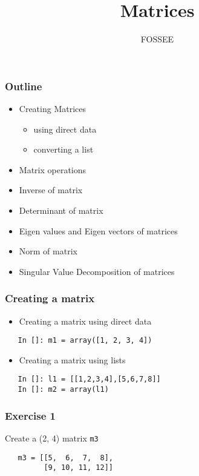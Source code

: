 \documentclass[presentation]{beamer}
\title{Matrices}
\author{FOSSEE}
\date{}
\begin{document}
\maketitle









\begin{frame}
\frametitle{Outline}
\label{sec-1}

\begin{itemize}
\item Creating Matrices

\begin{itemize}
\item using direct data
\item converting a list
\end{itemize}

\item Matrix operations
\item Inverse of matrix
\item Determinant of matrix
\item Eigen values and Eigen vectors of matrices
\item Norm of matrix
\item Singular Value Decomposition of matrices
\end{itemize}
\end{frame}
\begin{frame}[fragile]
\frametitle{Creating a matrix}
\label{sec-2}

\begin{itemize}
\item Creating a matrix using direct data
\end{itemize}

\begin{verbatim}
   In []: m1 = array([1, 2, 3, 4])
\end{verbatim}

\begin{itemize}
\item Creating a matrix using lists
\end{itemize}

\begin{verbatim}
   In []: l1 = [[1,2,3,4],[5,6,7,8]]
   In []: m2 = array(l1)
\end{verbatim}
\end{frame}
\begin{frame}[fragile]
\frametitle{Exercise 1}
\label{sec-3}

  Create a (2, 4) matrix \texttt{m3}
\begin{verbatim}
   m3 = [[5,  6,  7,  8],
         [9, 10, 11, 12]]
\end{verbatim}
\end{frame}
\end{document}
